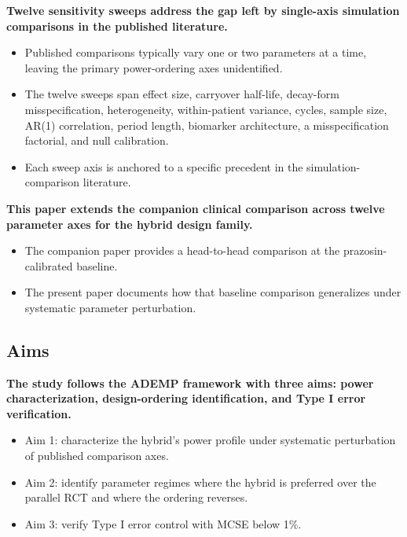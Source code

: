 \documentclass[
  11pt,
]{article}
\begin{document}
\textbf{Twelve sensitivity sweeps address the gap left by single-axis simulation comparisons in the published literature.}

\begin{itemize}\setlength{\itemsep}{2pt}\setlength{\parskip}{0pt}
\item Published comparisons typically vary one or two parameters at a time, leaving the primary power-ordering axes unidentified.
\item The twelve sweeps span effect size, carryover half-life, decay-form misspecification, heterogeneity, within-patient variance, cycles, sample size, AR(1) correlation, period length, biomarker architecture, a misspecification factorial, and null calibration.
\item Each sweep axis is anchored to a specific precedent in the simulation-comparison literature.
\end{itemize}

\textbf{This paper extends the companion clinical comparison across twelve parameter axes for the hybrid design family.}

\begin{itemize}\setlength{\itemsep}{2pt}\setlength{\parskip}{0pt}
\item The companion paper provides a head-to-head comparison at the prazosin-calibrated baseline.
\item The present paper documents how that baseline comparison generalizes under systematic parameter perturbation.
\end{itemize}

\subsection{Aims}\label{aims}

\textbf{The study follows the ADEMP framework with three aims: power characterization, design-ordering identification, and Type I error verification.}

\begin{itemize}\setlength{\itemsep}{2pt}\setlength{\parskip}{0pt}
\item Aim 1: characterize the hybrid's power profile under systematic perturbation of published comparison axes.
\item Aim 2: identify parameter regimes where the hybrid is preferred over the parallel RCT and where the ordering reverses.
\item Aim 3: verify Type I error control with MCSE below 1\%.
\end{itemize}
\end{document}
